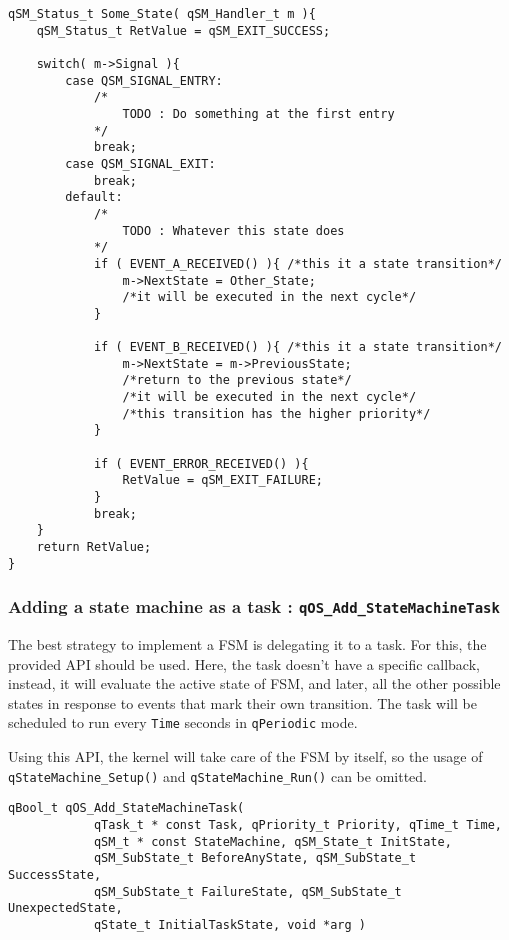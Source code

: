 \begin{lstlisting}[style=CStyle]
qSM_Status_t Some_State( qSM_Handler_t m ){
    qSM_Status_t RetValue = qSM_EXIT_SUCCESS;
    
    switch( m->Signal ){
        case QSM_SIGNAL_ENTRY:
            /*
                TODO : Do something at the first entry
            */        
            break;
        case QSM_SIGNAL_EXIT:
            break;
        default:
            /*
                TODO : Whatever this state does
            */
            if ( EVENT_A_RECEIVED() ){ /*this it a state transition*/
                m->NextState = Other_State; 
                /*it will be executed in the next cycle*/
            }
            
            if ( EVENT_B_RECEIVED() ){ /*this it a state transition*/
                m->NextState = m->PreviousState; 
                /*return to the previous state*/ 
                /*it will be executed in the next cycle*/
                /*this transition has the higher priority*/
            }       
            
            if ( EVENT_ERROR_RECEIVED() ){ 
                RetValue = qSM_EXIT_FAILURE;
            }
            break;
    }
    return RetValue;
}
\end{lstlisting}  

\subsubsection{Adding a state machine as a task : \texorpdfstring{\lstinline{qOS_Add_StateMachineTask}}{qOS_Add_StateMachineTask} } \label{statemachinetask}
The best strategy to implement a FSM is delegating it to a task. For this, the provided  API should be used. Here, the task doesn't have a specific callback, instead, it will evaluate the active state of FSM, and later, all the other possible states in response to events that mark their own transition. The task will be scheduled to run every \lstinline{Time} seconds in \lstinline{qPeriodic} mode. 


Using this API, the kernel will take care of the FSM by itself, so the usage of \lstinline{qStateMachine_Setup()} and \lstinline{qStateMachine_Run()} can be omitted. \\

\begin{lstlisting}[style=CStyle]
qBool_t qOS_Add_StateMachineTask( 
            qTask_t * const Task, qPriority_t Priority, qTime_t Time,
            qSM_t * const StateMachine, qSM_State_t InitState, 
            qSM_SubState_t BeforeAnyState, qSM_SubState_t SuccessState, 
            qSM_SubState_t FailureState, qSM_SubState_t UnexpectedState,
            qState_t InitialTaskState, void *arg )
\end{lstlisting}

